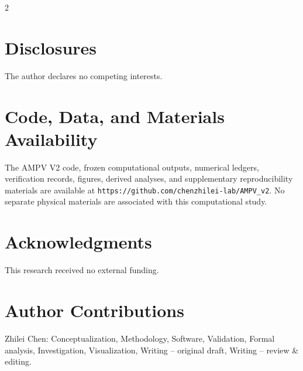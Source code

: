 ﻿\documentclass[12pt]{article}
\begin{document}
\begin{spacing}{2}



\section*{Disclosures}
The author declares no competing interests.

\section*{Code, Data, and Materials Availability}
The AMPV V2 code, frozen computational outputs, numerical ledgers, verification records, figures, derived analyses, and supplementary reproducibility materials are available at \texttt{https://github.com/chenzhilei-lab/AMPV\_v2}. No separate physical materials are associated with this computational study.

\section*{Acknowledgments}
This research received no external funding.

\section*{Author Contributions}
Zhilei Chen: Conceptualization, Methodology, Software, Validation, Formal analysis, Investigation, Visualization, Writing -- original draft, Writing -- review \& editing.


\end{spacing}
\end{document}
